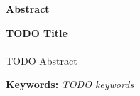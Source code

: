 \begin{center}
\textbf{Abstract}
\end{center}
\textbf{TODO Title}
\\
\\
TODO Abstract


\vspace*{\baselineskip}

\noindent\textbf{Keywords:} \textit{TODO keywords}
